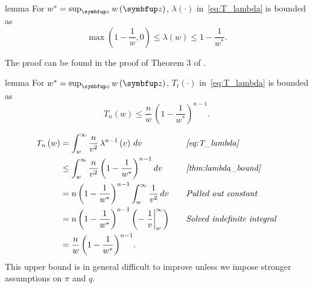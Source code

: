 
\begin{theoremEnd}{lemma}\label{thm:lambda_bound}
  For \(w^* = \sup_{\vz} w\left(\vz\right) \), \(\lambda\left(\cdot\right)\) in~\cref{eq:T_lambda} is bounded as
  \[
   \max\left(1 - \frac{1}{w}, 0\right) \leq \lambda\left(w\right) \leq 1 - \frac{1}{w^*}.
  \]
\end{theoremEnd}
\begin{proofEnd}
  The proof can be found in the proof of Theorem 3 of \citet{Smith96exacttransition}.
\end{proofEnd}

\begin{theoremEnd}{lemma}\label{thm:tn_bound}
  For \(w^* = \sup_{\vz} w\left(\vz\right) \), \(T_t\left(\cdot\right)\) in~\cref{eq:T_lambda} is bounded as
  \[
  T_n\left( w \right) \leq \frac{n}{w} \, {\left(1 - \frac{1}{w^*}\right)}^{n-1}.
  \]
\end{theoremEnd}
\begin{proofEnd}
  \begin{alignat*}{2}
    T_n\left(w\right) 
    &= \int_w^{\infty} \frac{n}{v^2} \, \lambda^{n-1}\left(v\right)\,dv
    &&\quad\text{\textit{\cref{eq:T_lambda}}}
    \\
    &\leq \int_w^{\infty} \frac{n}{v^2} \, {\left(1 - \frac{1}{w^*}\right)}^{n-1}\,dv
    &&\quad\text{\textit{\cref{thm:lambda_bound}}}
    \\
    &= n \, {\left(1 - \frac{1}{w^*}\right)}^{n-1}  \int_w^{\infty} \frac{1}{v^2} \,dv
    &&\quad\text{\textit{Pulled out constant}}
    \\
    &= n \, {\left(1 - \frac{1}{w^*}\right)}^{n-1}  \left( {-\left.\frac{1}{v}\right\rvert^{\infty}_{w}} \right)
    &&\quad\text{\textit{Solved indefinite integral}}
    \\
    &= \frac{n}{w} \, {\left(1 - \frac{1}{w^*}\right)}^{n-1}.
  \end{alignat*}
  This upper bound is in general difficult to improve unless we impose stronger assumptions on \(\pi\) and \(q\).
\end{proofEnd}

